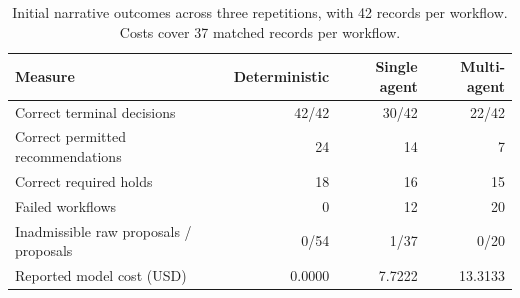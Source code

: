 \begin{table}[htbp]
\centering
\caption{Initial narrative outcomes across three repetitions, with 42 records per workflow. Costs cover 37 matched records per workflow.}
\label{tab:narrative-live}
\small
\begin{tabular*}{\textwidth}{@{\extracolsep{\fill}}lrrr@{}}
\toprule
Measure & Deterministic & Single agent & Multi-agent \\
\midrule
Correct terminal decisions & 42/42 & 30/42 & 22/42 \\
Correct permitted recommendations & 24 & 14 & 7 \\
Correct required holds & 18 & 16 & 15 \\
Failed workflows & 0 & 12 & 20 \\
Inadmissible raw proposals / proposals & 0/54 & 1/37 & 0/20 \\
Reported model cost (USD) & 0.0000 & 7.7222 & 13.3133 \\
\bottomrule
\end{tabular*}
\end{table}

